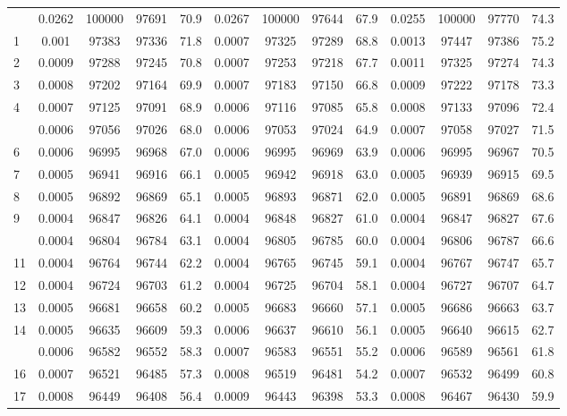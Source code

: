 \documentclass[
  14pt,
]{article}
\begin{document}
\begin{longtable}[t]{lcccccccccccc}
\endfoot
\bottomrule
\endlastfoot
0 & 0.0262 & 100000 & 97691 & 70.9 & 0.0267 & 100000 & 97644 & 67.9 & 0.0255 & 100000 & 97770 & 74.3\\
1 & 0.001 & 97383 & 97336 & 71.8 & 0.0007 & 97325 & 97289 & 68.8 & 0.0013 & 97447 & 97386 & 75.2\\
2 & 0.0009 & 97288 & 97245 & 70.8 & 0.0007 & 97253 & 97218 & 67.7 & 0.0011 & 97325 & 97274 & 74.3\\
3 & 0.0008 & 97202 & 97164 & 69.9 & 0.0007 & 97183 & 97150 & 66.8 & 0.0009 & 97222 & 97178 & 73.3\\
4 & 0.0007 & 97125 & 97091 & 68.9 & 0.0006 & 97116 & 97085 & 65.8 & 0.0008 & 97133 & 97096 & 72.4\\
\addlinespace
5 & 0.0006 & 97056 & 97026 & 68.0 & 0.0006 & 97053 & 97024 & 64.9 & 0.0007 & 97058 & 97027 & 71.5\\
6 & 0.0006 & 96995 & 96968 & 67.0 & 0.0006 & 96995 & 96969 & 63.9 & 0.0006 & 96995 & 96967 & 70.5\\
7 & 0.0005 & 96941 & 96916 & 66.1 & 0.0005 & 96942 & 96918 & 63.0 & 0.0005 & 96939 & 96915 & 69.5\\
8 & 0.0005 & 96892 & 96869 & 65.1 & 0.0005 & 96893 & 96871 & 62.0 & 0.0005 & 96891 & 96869 & 68.6\\
9 & 0.0004 & 96847 & 96826 & 64.1 & 0.0004 & 96848 & 96827 & 61.0 & 0.0004 & 96847 & 96827 & 67.6\\
\addlinespace
10 & 0.0004 & 96804 & 96784 & 63.1 & 0.0004 & 96805 & 96785 & 60.0 & 0.0004 & 96806 & 96787 & 66.6\\
11 & 0.0004 & 96764 & 96744 & 62.2 & 0.0004 & 96765 & 96745 & 59.1 & 0.0004 & 96767 & 96747 & 65.7\\
12 & 0.0004 & 96724 & 96703 & 61.2 & 0.0004 & 96725 & 96704 & 58.1 & 0.0004 & 96727 & 96707 & 64.7\\
13 & 0.0005 & 96681 & 96658 & 60.2 & 0.0005 & 96683 & 96660 & 57.1 & 0.0005 & 96686 & 96663 & 63.7\\
14 & 0.0005 & 96635 & 96609 & 59.3 & 0.0006 & 96637 & 96610 & 56.1 & 0.0005 & 96640 & 96615 & 62.7\\
\addlinespace
15 & 0.0006 & 96582 & 96552 & 58.3 & 0.0007 & 96583 & 96551 & 55.2 & 0.0006 & 96589 & 96561 & 61.8\\
16 & 0.0007 & 96521 & 96485 & 57.3 & 0.0008 & 96519 & 96481 & 54.2 & 0.0007 & 96532 & 96499 & 60.8\\
17 & 0.0008 & 96449 & 96408 & 56.4 & 0.0009 & 96443 & 96398 & 53.3 & 0.0008 & 96467 & 96430 & 59.9\\

\end{longtable}
\end{document}
